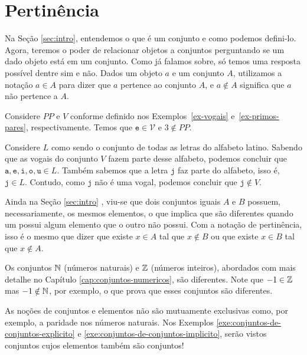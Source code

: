 \section{Pertinência}

Na Seção \ref{sec:intro}, entendemos o que é um conjunto e como podemos defini-lo.
Agora, teremos o poder de relacionar objetos a conjuntos perguntando se um dado objeto está em um conjunto.
Como já falamos sobre, só temos uma resposta possível dentre sim e não.
Dados um objeto $a$ e um conjunto $A$, utilizamos a notação $a \in A$ para dizer que $a$ pertence ao conjunto $A$, e $a \notin A$ significa que $a$ não pertence a $A$.

\begin{example}
Considere $PP$ e $V$ conforme definido nos Exemplos~\ref{ex-vogais} e~\ref{ex-primos-pares}, respectivamente. Temos que $\texttt{e} \in \mathcal{V}$ e $3 \notin PP$.
\end{example}

\begin{example}
Considere $L$ como sendo o conjunto de todas as letras do alfabeto latino.
Sabendo que as vogais do conjunto $V$ fazem parte desse alfabeto, podemos concluir que $\texttt{a}, \texttt{e}, \texttt{i}, \texttt{o}, \texttt{u} \in L$.
Também sabemos que a letra $\texttt{j}$ faz parte do alfabeto, isso é, $\texttt{j} \in L$.
Contudo, como $\texttt{j}$ não é uma vogal, podemos concluir que $\texttt{j} \notin V$.
\end{example}

Ainda na Seção \ref{sec:intro} , viu-se que dois conjuntos iguais $A$ e $B$ possuem, necessariamente, os mesmos elementos, o que implica que são diferentes quando um possui algum elemento que o outro não possui.
Com a notação de pertinência, isso é o mesmo que dizer que existe $x \in A$ tal que $x \notin B$ ou que existe $x \in B$ tal que $x \notin A$.

\begin{example}
Os conjuntos $\mathbb{N}$ (números naturais) e $\mathbb{Z}$ (números inteiros), abordados com mais detalhe no Capítulo \ref{cap:conjuntos-numericos}, são diferentes.
Note que $-1 \in \mathbb{Z}$ mas $-1 \notin \mathbb{N}$, por exemplo, o que prova que esses conjuntos são diferentes.
\end{example}

As noções de conjuntos e elementos não são mutuamente exclusivas como, por exemplo, a paridade nos números naturais. 
Nos Exemplos \ref{exe:conjuntos-de-conjuntos-explicito} e \ref{exe:conjuntos-de-conjuntos-implicito}, serão vistos conjuntos cujos elementos também são conjuntos!


